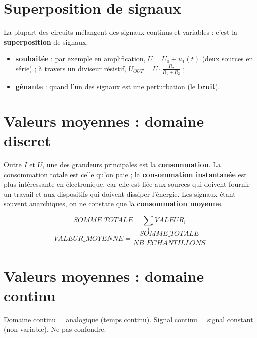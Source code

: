 \section{Superposition de signaux}


La plupart des circuits mélangent des signaux continus et variables : c'est la
\textbf{superposition} de signaux.
\begin{itemize}
  \item \textbf{souhaitée} : par exemple en amplification, $U = U_0 + u_1(t)$ (deux sources en
        série) ; à travers un diviseur résistif,
        $U_{OUT} = U\cdot\frac{R_2}{R_1+R_2}$ ;
  \item \textbf{gênante} : quand l'un des signaux est une perturbation (le \textbf{bruit}).
\end{itemize}

\section{Valeurs moyennes : domaine discret}


Outre $I$ et $U$, une des grandeurs principales est la \textbf{consommation}. La
consommation totale est celle qu'on paie ; la \textbf{consommation instantanée} est plus
intéressante en électronique, car elle est liée aux sources qui doivent fournir un travail et
aux dispositifs qui doivent dissiper l'énergie. Les signaux étant souvent
\og anarchiques\fg{}, on ne constate que la \textbf{consommation moyenne}.

\begin{defnbox}[title=Moyenne dans le monde discret]
\[ SOMME\_TOTALE = \sum_i VALEUR_i \]
\[ VALEUR\_MOYENNE = \frac{SOMME\_TOTALE}{NB\_ECHANTILLONS} \]
\end{defnbox}

\section{Valeurs moyennes : domaine continu}

\begin{warnbox}[title=Deux sens du mot \og continu\fg{}]
\og Domaine continu\fg{} = analogique (temps continu). \og Signal continu\fg{} = signal
constant (non variable). Ne pas confondre.
\end{warnbox}

